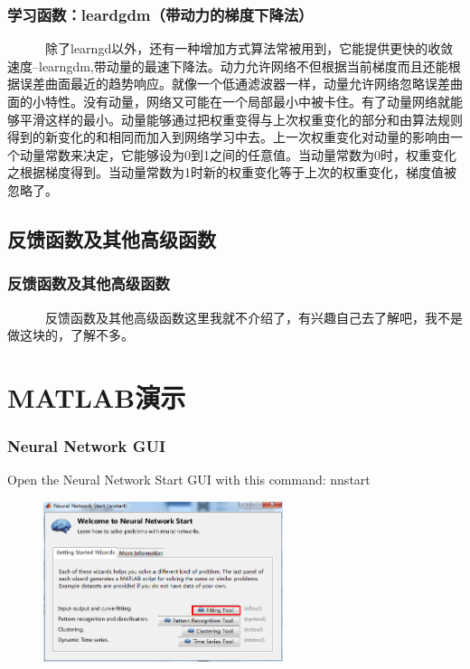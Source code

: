 \documentclass[slidestop,compress,mathserif,c]{beamer}
\begin{document}
\begin{frame}
\frametitle{学习函数：leardgdm（带动力的梯度下降法）}
~~~~~~除了learngd以外，还有一种增加方式算法常被用到，它能提供更快的收敛速度--learngdm,带动量的最速下降法。动力允许网络不但根据当前梯度而且还能根据误差曲面最近的趋势响应。就像一个低通滤波器一样，动量允许网络忽略误差曲面的小特性。没有动量，网络又可能在一个局部最小中被卡住。有了动量网络就能够平滑这样的最小。动量能够通过把权重变得与上次权重变化的部分和由算法规则得到的新变化的和相同而加入到网络学习中去。上一次权重变化对动量的影响由一个动量常数来决定，它能够设为0到1之间的任意值。当动量常数为0时，权重变化之根据梯度得到。当动量常数为1时新的权重变化等于上次的权重变化，梯度值被忽略了。

\end{frame}


\subsection{反馈函数及其他高级函数}
\begin{frame}
\frametitle{反馈函数及其他高级函数}
~~~~~~反馈函数及其他高级函数这里我就不介绍了，有兴趣自己去了解吧，我不是做这块的，了解不多。

\end{frame}

\section{MATLAB演示}
\begin{frame}
\frametitle{Neural Network GUI}
Open the Neural Network Start GUI with this command:
nnstart
\begin{figure}
\centering
\includegraphics[width=7cm]{1}
\end{figure}


\end{frame}
\end{document}
